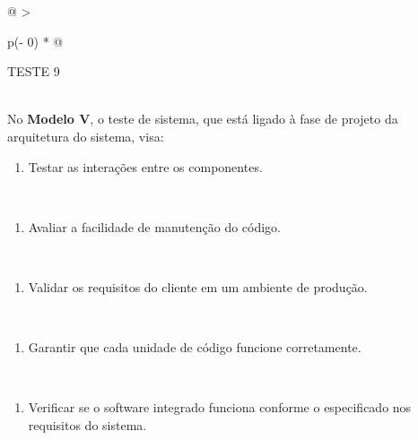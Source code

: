 \documentclass[
]{book}
\providecommand{\tightlist}{%
  \setlength{\itemsep}{0pt}\setlength{\parskip}{0pt}}
\begin{document}
\begin{longtable}[]{@{}
  >{\raggedright\arraybackslash}p{(\columnwidth - 0\tabcolsep) * }@{}}
\toprule\noalign{}
\begin{minipage}[b]{\linewidth}\raggedright
TESTE 9
\end{minipage} \\
\midrule\noalign{}
\endhead
\bottomrule\noalign{}
\endlastfoot
No \textbf{Modelo V}, o teste de sistema, que está ligado à fase de projeto da arquitetura do sistema, visa: \\
\begin{minipage}[t]{\linewidth}\raggedright
\begin{enumerate}
\def\labelenumi{\Alph{enumi})}
\tightlist
\item
  Testar as interações entre os componentes.
\end{enumerate}
\end{minipage} \\
\begin{minipage}[t]{\linewidth}\raggedright
\begin{enumerate}
\def\labelenumi{\Alph{enumi})}
\setcounter{enumi}{1}
\tightlist
\item
  Avaliar a facilidade de manutenção do código.
\end{enumerate}
\end{minipage} \\
\begin{minipage}[t]{\linewidth}\raggedright
\begin{enumerate}
\def\labelenumi{\Alph{enumi})}
\setcounter{enumi}{2}
\tightlist
\item
  Validar os requisitos do cliente em um ambiente de produção.
\end{enumerate}
\end{minipage} \\
\begin{minipage}[t]{\linewidth}\raggedright
\begin{enumerate}
\def\labelenumi{\Alph{enumi})}
\setcounter{enumi}{3}
\tightlist
\item
  Garantir que cada unidade de código funcione corretamente.
\end{enumerate}
\end{minipage} \\
\begin{minipage}[t]{\linewidth}\raggedright
\begin{enumerate}
\def\labelenumi{\Alph{enumi})}
\setcounter{enumi}{4}
\tightlist
\item
  Verificar se o software integrado funciona conforme o especificado nos requisitos do sistema.
\end{enumerate}
\end{minipage} \\
\end{longtable}
\end{document}
